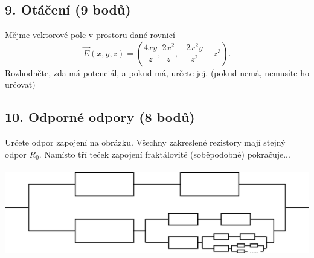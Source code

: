\documentclass[12pt,a4paper]{article}
\begin{document}
\subsection*{9. Otáčení (9 bodů)}
Mějme vektorové pole v prostoru dané rovnicí
\begin{equation}
\vec{E}\left(x,y,z\right) = \left(\frac{4xy}{z},\frac{2x^2}{z},-\frac{2x^2y}{z^2}-z^3\right).
\end{equation}
Rozhodněte, zda má potenciál, a pokud má, určete jej. (pokud nemá, nemusíte ho určovat)

\subsection*{10. Odporné odpory (8 bodů)}
Určete odpor zapojení na obrázku. Všechny zakreslené rezistory mají stejný odpor $R_0$. Namísto tří teček zapojení fraktálovitě (soběpodobně) pokračuje...\\\\
\includegraphics[scale=0.08]{img.png}
\end{document}
